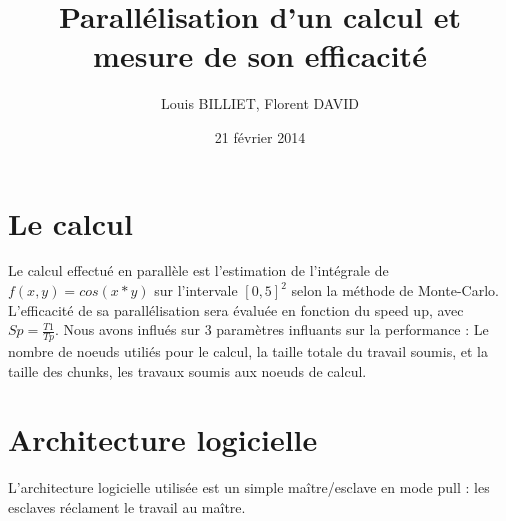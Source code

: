 \documentclass[oneside,10pt]{article}
\begin{document}
\title{Parall\'elisation d'un calcul et mesure de son efficacit\'e}
\author{Louis BILLIET, Florent DAVID}
\date{21 f\'evrier 2014}
\maketitle

\section{Le calcul}
Le calcul effectu\'e en parall\`ele est l'estimation de l'int\'egrale de $f(x,y)=cos(x*y)$ sur l'intervale $[0,5]^2$ selon la m\'ethode de Monte-Carlo.
L'efficacit\'e de sa parall\'elisation sera \'evalu\'ee en fonction du speed up, avec $Sp = \frac{T1}{Tp}$.
Nous avons influ\'es sur 3 param\`etres influants sur la performance : Le nombre de noeuds utili\'es pour le calcul, la taille totale du travail soumis, et la taille des chunks, les travaux soumis aux noeuds de calcul.

\section{Architecture logicielle}
L'architecture logicielle utilis\'ee est un simple ma\^itre/esclave en mode pull : les esclaves r\'eclament le travail au ma\^itre.
\end{document}
